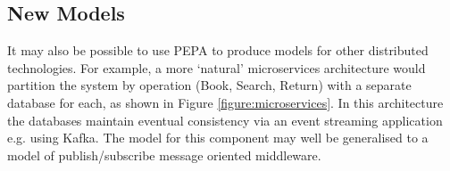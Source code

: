 \subsection{New Models}
It may also be possible to use PEPA to produce models for other distributed technologies.  For example, a more `natural' microservices architecture would partition the system by operation (Book, Search, Return) with a separate database for each, as shown in Figure \ref{figure:microservices}.  In this architecture the databases maintain eventual consistency via an event streaming application e.g. using Kafka.  The model for this component may well be generalised to a model of publish/subscribe message oriented middleware.


